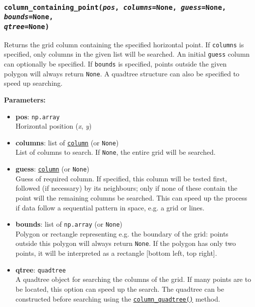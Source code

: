 \begin{snugshade}\subsubsection{\texttt{column\_containing\_point(\emph{pos}, \emph{columns}=None, \emph{guess}=None, \emph{bounds}=None,\\
\emph{qtree}=None)}}\end{snugshade}
\label{sec:mulgrid:column_containing_point}

Returns the grid column containing the specified horizontal point.  If \texttt{columns} is specified, only columns in the given list will be searched.  An initial \texttt{guess} column can optionally be specified.  If \texttt{bounds} is specified, points outside the given polygon will always return \texttt{None}.  A quadtree structure can also be specified to speed up searching.

\textbf{Parameters:}
\begin{itemize}
\item \textbf{pos}: \texttt{np.array}\\
  Horizontal position (\emph{x}, \emph{y})
\item \textbf{columns}: list of \hyperref[columnobjects]{\texttt{column}} (or \texttt{None})\\
  List of columns to search.  If \texttt{None}, the entire grid will be searched.
\item \textbf{guess}: \hyperref[columnobjects]{\texttt{column}} (or \texttt{None})\\
  Guess of required column.  If specified, this column will be tested first, followed (if necessary) by its neighbours; only if none of these contain the point will the remaining columns be searched.  This can speed up the process if data follow a sequential pattern in space, e.g. a grid or lines.
 \item \textbf{bounds}: list of \texttt{np.array} (or \texttt{None})\\
  Polygon or rectangle representing e.g. the boundary of the grid: points outside this polygon will always return \texttt{None}.  If the polygon has only two points, it will be interpreted as a rectangle [bottom left, top right].
 \item \textbf{qtree}: \texttt{quadtree} \\
   A quadtree object for searching the columns of the grid.  If many points are to be located, this option can speed up the search.  The quadtree can be constructed before searching using the \hyperref[sec:mulgrid:column_quadtree]{\texttt{column\_quadtree()}} method.
\end{itemize}

